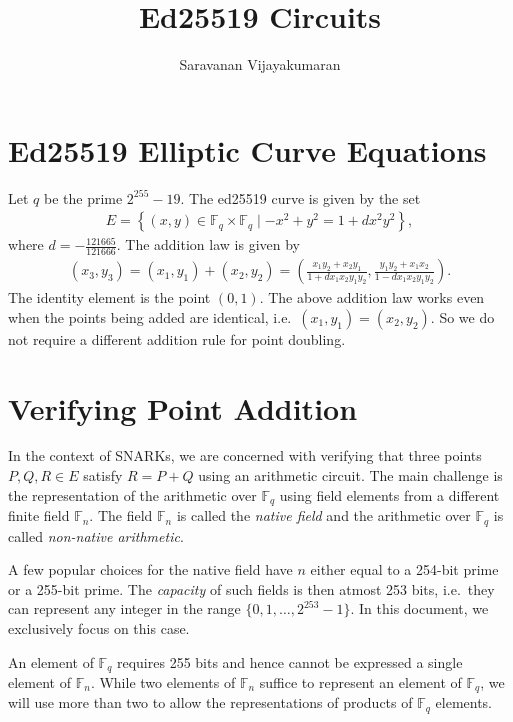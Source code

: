 \documentclass[a4paper, 12pt]{article}
\title{Ed25519 Circuits}
\author{Saravanan Vijayakumaran}
\begin{document}
\maketitle

\section{Ed25519 Elliptic Curve Equations}%
\label{sec:curve_equations}
Let $q$ be the prime $2^{255}-19$. The ed25519 curve is given by the set
\begin{align}
  E = \left\{ (x,y) \in \mathbb{F}_q \times \mathbb{F}_q \mid -x^2+y^2=1+dx^2y^2 \right\},
  \label{eqn:curve}
\end{align}
where $d = -\frac{121665}{121666}$. The addition law is given by
\begin{align}
  (x_3, y_3) = (x_1, y_1) + (x_2, y_2) = \left( \frac{x_1y_2+x_2y_1}{1+dx_1x_2y_1y_2}, \frac{y_1y_2 + x_1x_2}{1-dx_1x_2y_1y_2}  \right).
  \label{eqn:addition}
\end{align}
The identity element is the point $(0,1)$. The above addition law works even when the points being added are identical, i.e.~$(x_1, y_1) = (x_2, y_2)$. So we do not require a different addition rule for point doubling.

\section{Verifying Point Addition}%
\label{sec:verifying_point_addition}
In the context of SNARKs, we are concerned with verifying that three points $P, Q, R \in E$ satisfy $R= P+Q$ using an arithmetic circuit. The main challenge is the representation of the arithmetic over $\mathbb{F}_q$ using field elements from a different finite field $\mathbb{F}_n$. The field $\mathbb{F}_n$ is called the \textit{native field} and the arithmetic over $\mathbb{F}_q$ is called \textit{non-native arithmetic}.

A few popular choices for the native field have $n$ either equal to a 254-bit prime or a 255-bit prime. The \textit{capacity} of such fields is then atmost 253 bits, i.e.~they can represent any integer in the range $\{0,1,\ldots,2^{253}-1\}$. In this document, we exclusively focus on this case.

An element of $\mathbb{F}_q$ requires 255 bits and hence cannot be expressed a single element of $\mathbb{F}_n$. While two elements of $\mathbb{F}_n$ suffice to represent an element of $\mathbb{F}_q$, we will use more than two to allow the representations of products of $\mathbb{F}_q$ elements.
\end{document}
